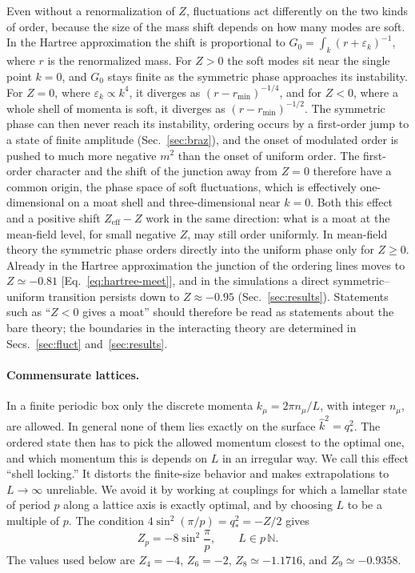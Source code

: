 \documentclass[aps,prd,twocolumn,superscriptaddress,nofootinbib,10pt]{revtex4-2}
\newcommand{\khat}{\widehat{k}^{2}}
\newcommand{\qs}{q_*}
\newcommand{\eff}{\mathrm{eff}}
\begin{document}
Even without a renormalization of $Z$, fluctuations act differently on the two
kinds of order, because the size of the mass shift depends on how many modes
are soft.  In the Hartree approximation the shift is proportional to
$G_0=\int_k (r+\varepsilon_k)^{-1}$, where $r$ is the renormalized mass.  For $Z>0$
the soft modes sit near the single point $k=0$, and $G_0$ stays finite as
the symmetric phase approaches its instability.  For $Z=0$, where
$\varepsilon_k\propto k^4$, it diverges as $(r-r_{\min})^{-1/4}$, and for
$Z<0$, where a whole shell of momenta is soft, it diverges as
$(r-r_{\min})^{-1/2}$.  The symmetric phase can then never reach its
instability, ordering occurs by a first-order jump to a state of finite
amplitude (Sec.~\ref{sec:braz}), and the onset of modulated order is pushed
to much more negative $m^2$ than the onset of uniform order.  The
first-order character and the shift of the junction away from $Z=0$
therefore have a common origin, the phase space of soft fluctuations, which
is effectively one-dimensional on a moat shell and three-dimensional near
$k=0$.  Both this effect and a positive shift $Z_\eff-Z$ work in the same direction: what is a
moat at the mean-field level, for small negative $Z$, may still order
uniformly.  In mean-field theory the symmetric phase orders directly into the
uniform phase only for $Z\ge0$.  Already in the Hartree approximation the
junction of the ordering lines moves to $Z\simeq-0.81$
[Eq.~\eqref{eq:hartree-meet}], and in the simulations a direct
symmetric--uniform transition persists down to $Z\approx-0.95$
(Sec.~\ref{sec:results}).  Statements such as ``$Z<0$ gives a moat'' should
therefore be read as statements about the bare theory; the boundaries in the
interacting theory are determined in Secs.~\ref{sec:fluct}
and~\ref{sec:results}.

\paragraph*{Commensurate lattices.}
In a finite periodic box only the discrete momenta $k_\mu=2\pi n_\mu/L$, with
integer $n_\mu$, are allowed.  In general none of them lies exactly on the
surface $\khat=\qs^2$.  The ordered state then has to pick the allowed
momentum closest to the optimal one, and which momentum this is depends on
$L$ in an irregular way.  We call this effect ``shell locking.''  It distorts
the finite-size behavior and makes extrapolations to $L\to\infty$ unreliable.
We avoid it by working at couplings for which a lamellar state of period $p$
along a lattice axis is exactly optimal, and by choosing $L$ to be a multiple
of $p$.  The condition $4\sin^2(\pi/p)=\qs^2=-Z/2$ gives
\begin{equation}
 Z_p=-8\sin^2\frac{\pi}{p},\qquad L\in p\,\mathbb{N}.
 \label{eq:commensurate}
\end{equation}
The values used below are $Z_4=-4$, $Z_6=-2$, $Z_8\simeq-1.1716$, and
$Z_9\simeq-0.9358$.
\end{document}
